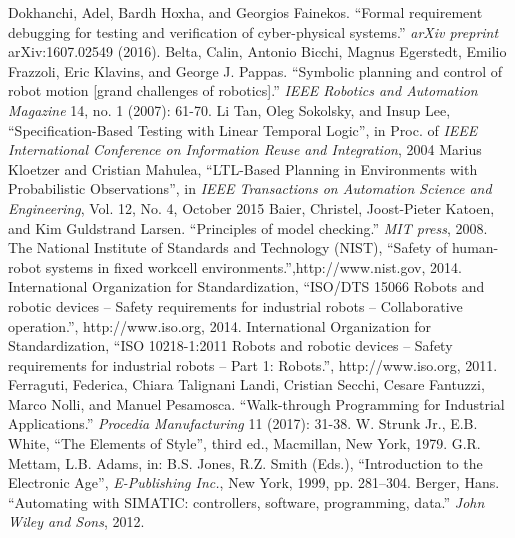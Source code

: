 \documentclass[3p,twocolumn,times,procedia]{elsarticle}
\newcommand{\quotes}[1]{``#1''}
\begin{document}
\begin{thebibliography}{}
Dokhanchi, Adel, Bardh Hoxha, and Georgios Fainekos. \quotes{Formal requirement debugging for testing and verification of cyber-physical systems.} \emph{arXiv preprint} arXiv:1607.02549 (2016).
Belta, Calin, Antonio Bicchi, Magnus Egerstedt, Emilio Frazzoli, Eric Klavins, and George J. Pappas. \quotes{Symbolic planning and control of robot motion [grand challenges of robotics].} \emph{IEEE Robotics and Automation Magazine} 14, no. 1 (2007): 61-70.
Li Tan, Oleg Sokolsky, and Insup Lee, \quotes{Specification-Based Testing with Linear Temporal Logic}, in Proc. of \emph{IEEE International Conference on Information Reuse and Integration}, 2004
Marius Kloetzer and Cristian Mahulea, \quotes{LTL-Based Planning in Environments with Probabilistic Observations}, in \emph{IEEE Transactions on Automation Science and Engineering}, Vol. 12, No. 4, October 2015
Baier, Christel, Joost-Pieter Katoen, and Kim Guldstrand Larsen. \quotes{Principles of model checking.} \emph{MIT press}, 2008.
The  National  Institute  of  Standards  and  Technology  (NIST), \quotes{Safety of human-robot systems in fixed workcell environments.},http://www.nist.gov, 2014.
International  Organization  for  Standardization, \quotes{ISO/DTS  15066  Robots  and  robotic  devices  –  Safety  requirements  for  industrial  robots  –  Collaborative  operation.}, http://www.iso.org, 2014.
International  Organization  for  Standardization, \quotes{ISO  10218-1:2011  Robots  and  robotic  devices  –  Safety  requirements for industrial robots – Part 1: Robots.}, http://www.iso.org, 2011.
Ferraguti, Federica, Chiara Talignani Landi, Cristian Secchi, Cesare Fantuzzi, Marco Nolli, and Manuel Pesamosca. \quotes{Walk-through Programming for Industrial Applications.} \emph{Procedia Manufacturing} 11 (2017): 31-38.
 W. Strunk Jr., E.B. White, \quotes{The Elements of Style}, third ed., Macmillan, New York, 1979.
 G.R. Mettam, L.B. Adams, in: B.S. Jones, R.Z. Smith (Eds.), \quotes{Introduction to the Electronic Age}, \emph{E-Publishing Inc.}, New York, 1999, pp. 281--304.
Berger, Hans. \quotes{Automating with SIMATIC: controllers, software, programming, data.} \emph{John Wiley and Sons}, 2012.
 \end{thebibliography}
\end{document}
